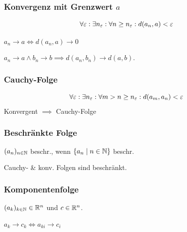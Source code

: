 \subsubsection*{Konvergenz mit Grenzwert $a$}
\[\forall \varepsilon: \exists n_\varepsilon: \forall n \ge n_\varepsilon: d(a_n, a) < \varepsilon\]

$a_n \to a \iff d(a_n,a) \to 0$

$a_n \to a \land b_n \to b \implies d(a_n,b_n) \to d(a,b)$.

\subsubsection*{Cauchy-Folge}
\[\forall \varepsilon: \exists n_\varepsilon: \forall m>n \ge n_\varepsilon: d(a_m, a_n) < \varepsilon\]
Konvergent $\implies$ Cauchy-Folge

\subsubsection*{Beschränkte Folge}
$(a_n)_{n\in\mathbb{N}}$ beschr., wenn $\{a_n \mid n\in\mathbb{N}\}$ beschr.

Cauchy- \& konv. Folgen sind beschränkt.

\subsubsection*{Komponentenfolge}
$(a_k)_{k\in\mathbb{N}} \in \mathbb{R}^n$ und $c \in \mathbb{R}^n$.

$a_k \to c_k \iff a_{ki} \to c_i$
